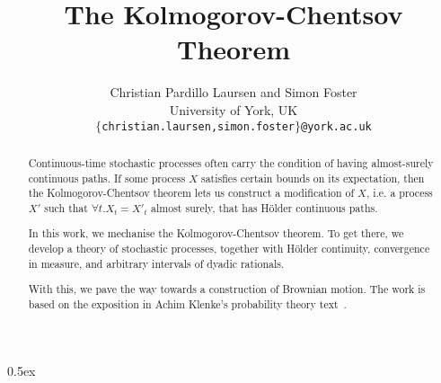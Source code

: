 \documentclass[11pt,a4paper]{article}
\begin{document}
\title{The Kolmogorov-Chentsov Theorem}
\author{Christian Pardillo Laursen and Simon Foster\\[.5ex] University of York, UK \\[2ex] \texttt{\small $\{$christian.laursen,simon.foster$\}$@york.ac.uk}}
\maketitle

\begin{abstract}
Continuous-time stochastic processes often carry the condition of having
almost-surely continuous paths. If some process \(X\) satisfies certain
bounds on its expectation, then the Kolmogorov-Chentsov theorem lets us
construct a modification of \(X\), i.e. a process \(X'\) such that
\(\forall t. X_t = X'_t\) almost surely, that has H{\"o}lder continuous
paths.

In this work, we mechanise the Kolmogorov-Chentsov theorem. To get there, we
develop a theory of stochastic processes, together with H{\"o}lder continuity,
convergence in measure, and arbitrary intervals of dyadic rationals.

With this, we pave the way towards a construction of Brownian motion. The
work is based on the exposition in Achim Klenke's probability theory text~\cite{klenke2020}.
\end{abstract}

\tableofcontents

\parindent 0pt\parskip 0.5ex



\vspace{4ex}



\end{document}
